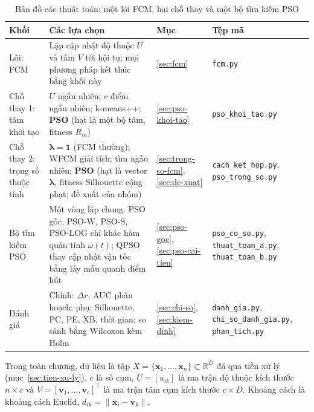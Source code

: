 \begin{table}[htbp]
\centering
\caption{Bản đồ các thuật toán: một lõi FCM, hai chỗ thay và một bộ tìm kiếm PSO}
\label{tab:ch2-ban-do}
\footnotesize
\setlength{\tabcolsep}{3pt}
\renewcommand{\arraystretch}{1.2}
\begin{tabular}{@{}>{\raggedright\arraybackslash}p{2.5cm}>{\raggedright\arraybackslash}p{7.0cm}>{\raggedright\arraybackslash}p{1.6cm}>{\raggedright\arraybackslash}p{3.6cm}@{}}
\toprule
Khối & Các lựa chọn & Mục & Tệp mã \\
\midrule
Lõi: FCM & Lặp cập nhật độ thuộc $U$ và tâm $V$ tới hội tụ; mọi phương pháp kết thúc bằng khối này &
\ref{sec:fcm} & \texttt{fcm.py} \\
\addlinespace
Chỗ thay 1: tâm khởi tạo & $U$ ngẫu nhiên; $c$ điểm ngẫu nhiên; k-means++; \textbf{PSO} (hạt là một bộ tâm, fitness $R_m$) &
\ref{sec:pso-khoi-tao} & \texttt{pso\_khoi\_tao.py} \\
\addlinespace
Chỗ thay 2: trọng số thuộc tính & $\symbf{\lambda} = \mathbf{1}$ (FCM thường); WFCM giải tích; tìm ngẫu nhiên; \textbf{PSO} (hạt là
vector $\symbf{\lambda}$, fitness Silhouette cộng phạt; đề xuất của nhóm) & \ref{sec:trong-so-fcm}, \ref{sec:de-xuat} &
\texttt{cach\_ket\_hop.py}, \texttt{pso\_trong\_so.py} \\
\addlinespace
Bộ tìm kiếm PSO & Một vòng lặp chung. PSO gốc, PSO-W, PSO-S, PSO-LOG chỉ khác hàm quán tính $\omega(t)$; QPSO thay cập nhật vận
tốc bằng lấy mẫu quanh điểm hút & \ref{sec:pso-goc}, \ref{sec:pso-cai-tien} & \texttt{pso\_co\_so.py}, \texttt{thuat\_toan\_a.py},
\texttt{thuat\_toan\_b.py} \\
\addlinespace
Đánh giá & Chính: $\Delta r$, AUC phân hoạch; phụ: Silhouette, PC, PE, XB, thời gian; so sánh bằng Wilcoxon kèm Holm &
\ref{sec:chi-so}, \ref{sec:kiem-dinh} & \texttt{danh\_gia.py}, \texttt{chi\_so\_danh\_gia.py}, \texttt{phan\_tich.py} \\
\bottomrule
\end{tabular}
\end{table}

Trong toàn chương, dữ liệu là tập $X = \{\mathbf{x}_1, \dots, \mathbf{x}_n\} \subset \mathbb{R}^D$ đã qua tiền xử lý
(mục~\ref{sec:tien-xu-ly}), $c$ là số cụm, $U = [u_{ik}]$ là ma trận độ thuộc kích thước $n \times c$ và
$V = [\mathbf{v}_1, \dots, \mathbf{v}_c]^{\top}$ là ma trận tâm cụm kích thước $c \times D$. Khoảng cách là khoảng cách
Euclid, $d_{ik} = \lVert \mathbf{x}_i - \mathbf{v}_k \rVert$.

